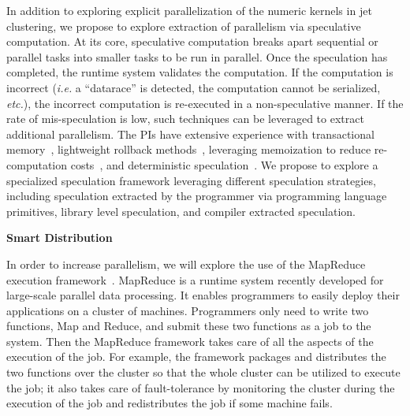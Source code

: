 \documentclass[12pt]{article}
\begin{document}
In addition to exploring explicit parallelization of the numeric kernels in jet clustering, we
propose to explore extraction of parallelism via speculative computation. At its core, speculative
computation breaks apart sequential or parallel tasks into smaller tasks to be run in parallel. Once
the speculation has completed, the runtime system validates the computation. If the computation is
incorrect ({\em i.e.} a ``datarace'' is detected, the computation cannot be serialized, {\em etc.}), the
incorrect computation is re-executed in a non-speculative manner.  If the rate of mis-speculation
is low, such techniques can be leveraged to extract additional
parallelism. 
The PIs have extensive experience with transactional memory~\cite{trans}, lightweight rollback methods~\cite{stab}, 
leveraging memoization to reduce re-computation costs~\cite{memo1, memo2},
and deterministic speculation~\cite{iso}. We propose to explore a specialized speculation framework leveraging different
speculation strategies, including speculation extracted by the programmer via programming language primitives,
library level speculation, and compiler extracted speculation.



\bigskip
\noindent
{\bf Smart Distribution}
\bigskip

In order to increase parallelism, we will explore the use of the MapReduce
execution framework~\cite{mapreduce-osdi, mapreduce-hadoop}. MapReduce is a
runtime system recently developed for large-scale parallel data processing. It
enables programmers to easily deploy their applications on a cluster of
machines. Programmers only need to write two functions, Map and Reduce, and
submit these two functions as a job to the system. Then the MapReduce framework
takes care of all the aspects of the execution of the job. For example, the
framework packages and distributes the two functions over the cluster so that
the whole cluster can be utilized to execute the job; it also takes care of
fault-tolerance by monitoring the cluster during the execution of the job and
redistributes the job if some machine fails.
\end{document}
